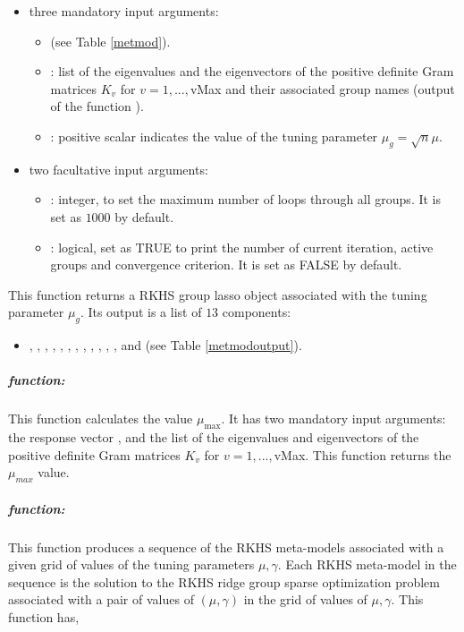 \begin{itemize}
\item three mandatory input arguments: 
\begin{itemize}
\item {} (see Table \ref{metmod}). 
\item {}: list of the eigenvalues and the eigenvectors of the positive definite Gram matrices $K_v$ for $v=1,...,$vMax and their associated group names (output of the function ).
\item {}: positive scalar indicates the value of the tuning parameter $\mu_g=\sqrt{n}\mu$. 
\end{itemize}
\item two facultative input arguments: 
\begin{itemize}
\item {}: integer, to set the maximum number of loops through all groups. It is set as $1000$ by default. 
\item {}: logical, set as TRUE to print the number of current iteration, active groups and convergence criterion. It is set as FALSE by default.
\end{itemize}
\end{itemize}
This function returns a RKHS group lasso object associated with the tuning parameter $\mu_g$. Its output is a list of $13$ components:
\begin{itemize}
\item {}, , , , , , , , , , , , and  (see Table \ref{metmodoutput}). 
\end{itemize}
\subparagraph*{ function:} 
This function calculates the value $\mu_{\text{max}}$. 
It has two mandatory input arguments: the response vector , and the list  of the eigenvalues and eigenvectors of the positive definite Gram matrices $K_v$ for $v=1,...,$vMax. This function returns the $\mu_{max}$ value.
\subparagraph*{ function:} 
This function produces a sequence of the RKHS meta-models associated with a given grid of values of the tuning parameters $\mu,\gamma$. Each RKHS meta-model in the sequence is the solution to the RKHS ridge group sparse optimization problem associated with a pair of values of $(\mu,\gamma)$ in the grid of values of $\mu,\gamma$.
This function has,
